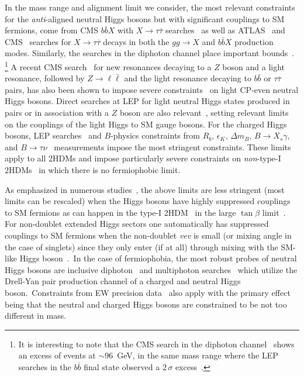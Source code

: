 \documentclass[../report.tex]{subfiles}
\begin{document}
\label{sec:limits}


In the mass range and alignment limit we consider, the most relevant
constraints for the \emph{anti}-aligned neutral Higgs bosons but with
significant couplings to SM fermions, come from CMS $b\bar{b}X$ with $X
\to \tau\bar{\tau}$ searches~\cite{Khachatryan:2015baw} as well as
ATLAS~\cite{Aad:2014vgg} and CMS~\cite{Khachatryan:2014wca} searches for
$X \to \tau\bar{\tau}$ decays in both the $gg \to X$ and $b\bar{b}X$
production modes. Similarly, the searches in the diphoton channel
  place important bounds~\cite{CMS-PAS-HIG-17-013,ATLAS-CONF-2018-025}.%
\footnote{It is interesting to note that the CMS search in the diphoton
  channel~\cite{CMS-PAS-HIG-17-013} shows an excess of events at $\sim
  96$~GeV, in the same mass range where the LEP searches in the 
  $b \bar b$ final state observed a $2\,\sigma$ excess~\cite{Schael:2006cr}.}
A recent CMS search~\cite{CMS:2015mba} for new
resonances decaying to a $Z$ boson and a light resonance, followed by 
$Z \to \ell\bar\ell$ and the light resonance decaying to $b\bar{b}$ or
$\tau\bar{\tau}$ pairs, has also been shown to impose severe
constraints~\cite{Bernon:2015wef} on light CP-even neutral Higgs
bosons. Direct searches at LEP for light neutral Higgs states produced
in pairs or in association with a $Z$ boson are also
relevant~\cite{Barate:2003sz,Abbiendi:2004gn,Schael:2006cr},
setting relevant limits on the couplings of the light Higgs to SM
gauge bosons. For
the charged Higgs bosons, LEP searches~\cite{Abbiendi:2013hk} and
$B$-physics constraints from $R_b,\,\epsilon_K,\,\Delta m_B,\,B\to
X_s\gamma$, and
$B\to\tau\nu$~\cite{Haisch:2008ar,Mahmoudi:2009zx,Gupta:2009wn,Jung:2010ik,Misiak:2015xwa}
measurements impose the most stringent constraints. These limits apply
to all 2HDMs and impose particularly severe constraints on
\emph{non}-type-I 2HDMs~\cite{Bernon:2015wef} in which there is no
fermiophobic limit.  

As emphasized in numerous studies~\cite{Ilisie:2014hea,Enberg:2016ygw,Delgado:2016arn,Degrande:2017naf,Vega:2018ddp}, the above limits are less stringent (most limits can be rescaled) when the Higgs bosons have highly suppressed couplings to SM fermions as can happen in the type-I 2HDM~\cite{Haber:1978jt} in the large $\tan\beta$ limit~\cite{Akeroyd:1995hg}. For non-doublet extended Higgs sectors one automatically has suppressed couplings to SM fermions when the non-doublet \emph{vev} is small (or mixing angle in the case of singlets) since they only enter (if at all) through mixing with the SM-like Higgs boson~\cite{Killick:2013mya}.~In the case of fermiophobia, the most robust probes of neutral Higgs bosons are inclusive diphoton~\cite{Delgado:2016arn,Degrande:2017naf,Vega:2018ddp} and multiphoton searches~\cite{Akeroyd:2005pr,Abdallah:2003xf,Aaltonen:2016fnw} which utilize the Drell-Yan pair production channel of a charged and neutral Higgs boson.~Constraints from EW precision data~\cite{Baak:2011ze,ALEPH:2010aa} also apply with the primary effect being that the neutral and charged Higgs bosons are constrained to be not too different in mass.  
\end{document}
